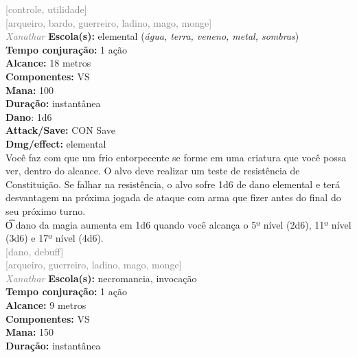 \documentclass{RPG_Adventure}[2021/10/20]
\begin{document}
{\scriptsize \textcolor{gray}{[controle, utilidade]\\}}
{\scriptsize \textcolor{gray}{[arqueiro, bardo, guerreiro, ladino, mago, monge]\\}}
{\tiny \textcolor{gray}{\textit{Xanathar}}}
{\small \t \textbf{Escola(s):} elemental (\textit{água, terra, veneno, metal, sombras})\\\t \textbf{Tempo conjuração:} 1 ação\\\t \textbf{Alcance:} 18 metros\\\t \textbf{Componentes:} VS\\\t \textbf{Mana:} 100\\\t \textbf{Duração:} instantânea\\\t \textbf{Dano}: 1d6\\\t \textbf{Attack/Save:} CON Save\\\t \textbf{Dmg/effect:} elemental\\}
{\normalsize Você faz com que um frio entorpecente se forme em uma criatura que você possa ver, dentro do alcance. O alvo deve realizar um teste de resistência de Constituição. Se falhar na resistência, o alvo sofre 1d6 de dano elemental e terá desvantagem na próxima jogada de ataque com arma que fizer antes do final do seu próximo turno.\\\t O dano da magia aumenta em 1d6 quando você alcança o 5º nível (2d6), 11º nível (3d6) e 17º nível (4d6).\\}
{\scriptsize \textcolor{gray}{[dano, debuff]\\}}
{\scriptsize \textcolor{gray}{[arqueiro, guerreiro, ladino, mago, monge]\\}}
{\tiny \textcolor{gray}{\textit{Xanathar}}}
{\small \t \textbf{Escola(s):} necromancia, invocação\\\t \textbf{Tempo conjuração:} 1 ação\\\t \textbf{Alcance:} 9 metros\\\t \textbf{Componentes:} VS\\\t \textbf{Mana:} 150\\\t \textbf{Duração:} instantânea\\}
\end{document}
